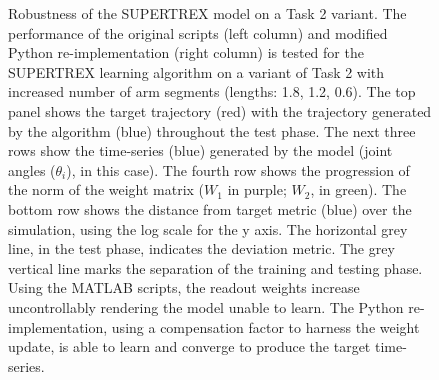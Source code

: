 \begin{figure}
\caption{Robustness of the SUPERTREX model on a Task 2 variant. The performance of the original scripts (left column) and modified Python re-implementation (right column) is tested for the SUPERTREX learning algorithm on a variant of Task 2 with increased number of arm segments (lengths: 1.8, 1.2, 0.6). The top panel shows the target trajectory (red) with the trajectory generated by the algorithm (blue) throughout the test phase. The next three rows show the time-series (blue) generated by the model (joint angles ($\theta_i$), in this case). The fourth row shows the progression of the norm of the weight matrix ($W_1$ in purple; $W_2$, in green). The bottom row shows the distance from target metric (blue) over the simulation, using the log scale for the y axis. The horizontal grey line, in the test phase, indicates the deviation metric. The grey vertical line marks the separation of the training and testing phase. Using the MATLAB scripts, the readout weights increase uncontrollably rendering the model unable to learn. The Python re-implementation, using a compensation factor to harness the weight update, is able to learn and converge to produce the target time-series.}
\label{Fig:Comparison_Task2_Seg3}

\end{figure}

